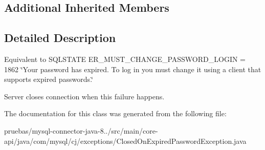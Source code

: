 \subsection*{Additional Inherited Members}


\subsection{Detailed Description}
Equivalent to S\+Q\+L\+S\+T\+A\+TE E\+R\+\_\+\+M\+U\+S\+T\+\_\+\+C\+H\+A\+N\+G\+E\+\_\+\+P\+A\+S\+S\+W\+O\+R\+D\+\_\+\+L\+O\+G\+IN = 1862 \char`\"{}\+Your password has expired. To log in you must change it using a client that supports expired passwords.\char`\"{}

Server closes connection when this failure happens. 

The documentation for this class was generated from the following file\+:\begin{DoxyCompactItemize}
\item 
pruebas/mysql-\/connector-\/java-\/8../src/main/core-\/api/java/com/mysql/cj/exceptions/Closed\+On\+Expired\+Password\+Exception.\+java\end{DoxyCompactItemize}

